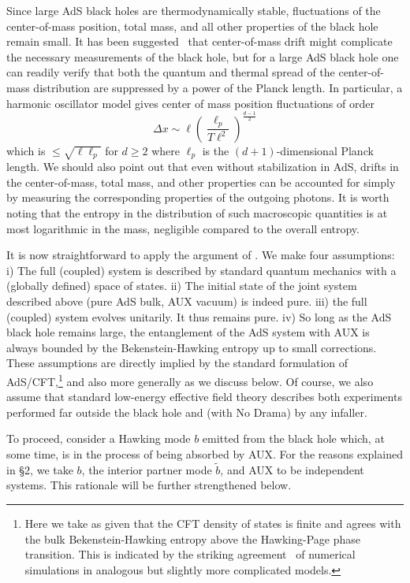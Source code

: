 \documentclass[12pt]{article}
\newcommand{\be}{\begin{equation}}
\newcommand{\ee}{\end{equation}}
\begin{document}
{{Since large AdS black holes are thermodynamically stable, fluctuations} of the center-of-mass position, total mass, and all other properties of the black hole remain small.  It has been suggested~\cite{SussP,Nomura2,Hsu}
that center-of-mass drift might complicate the necessary measurements of the black hole, but for a large AdS black hole one can readily verify that both the quantum and thermal spread of the center-of-mass distribution are {suppressed by a power of} the Planck length. In particular, a harmonic oscillator model gives center of mass position fluctuations of {order
\be
\Delta x \sim \ell {\left( \frac{\ell_p}{T\ell^2} \right)^{\frac{d-1}{2}}}
\ee
which is $\le \sqrt{\ell \ell_p}$ for $d \ge 2$ }where $\ell_p$ is the $(d+1)$-dimensional Planck length.  We should also point out that even without stabilization in AdS, drifts in the center-of-mass, total mass, and other properties can  be accounted for simply by measuring the corresponding properties of the outgoing photons.  It is worth noting that the entropy in the distribution of such macroscopic quantities is at most logarithmic in the mass, negligible compared to the overall entropy.

It is now straightforward to apply the argument of \cite{Almheiri:2012rt}.  We make four assumptions: i) The full (coupled) system is described by standard quantum mechanics with a (globally defined) space of states.
ii) The initial state of the joint system described above (pure AdS bulk, AUX vacuum) is indeed pure. iii) the full (coupled) system evolves unitarily. It thus remains pure.  iv) So long as the AdS black hole remains large, the entanglement of the AdS system with AUX is always bounded by the Bekenstein-Hawking entropy up to small corrections.  These assumptions are directly implied by the standard formulation of AdS/CFT,\footnote{Here we take as given that the CFT density of states is finite and agrees with the bulk Bekenstein-Hawking entropy above the Hawking-Page phase transition.  This is indicated by the striking agreement~\cite{Hanada:2008ez} of numerical simulations in analogous but slightly more complicated models. } and also more generally as we discuss below.  Of course, we also assume that standard low-energy effective field theory describes both experiments performed far outside the black hole and (with No Drama) by any infaller.

To proceed, consider a Hawking mode $b$ emitted from the black hole which, at some time, is in the process of being absorbed by AUX.  For the reasons explained in \S2, we take $b$, the interior partner mode $\tilde b$, and AUX to be independent systems.  This rationale will be further strengthened below.


}
\end{document}

